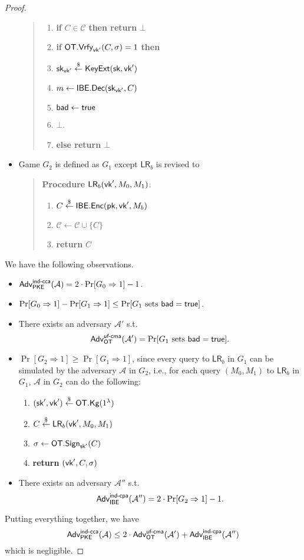 \documentclass[12pt]{article}
\newcommand{\getsr}{\stackrel{\$}{\gets}}
\newcommand{\Adv}{\textsf{Adv}}
\newcommand{\tab}{\hspace{0.3in}}
\newcommand{\Vrfy}{\textsf{Vrfy}}
\newcommand{\true}{\textsf{true}}
\newcommand{\C}{\mathcal{C}}
\theoremstyle{definition}
\newcommand{\PKE}{\textsf{PKE}}
\newcommand{\Kg}{\textsf{Kg}}
\newcommand{\Enc}{\textsf{Enc}}
\newcommand{\Dec}{\textsf{Dec}}
\newcommand{\pk}{\textsf{pk}}
\newcommand{\sk}{\textsf{sk}}
\newcommand{\A}{\mathcal{A}}
\newcommand{\LR}{\textsf{LR}}
\begin{document}
\begin{proof}
\begin{itemize}
\begin{quote}
\begin{enumerate}
\item {\bf if} $C \in \C$ {\bf then return} $\bot$
\item {\bf if} $\OT.\Vrfy_{\vk'}(C,\sigma)=1$ {\bf then}
\item \tab $\sk_{\vk'} \getsr \KeyExt(\sk, \vk')$
\item \tab $m \gets \IBE.\Dec(\sk_{\vk'}, C)$
\item \tab $\bad \gets \true$
\item \tab {\bf return} $\bot$.
\item {\bf else return} $\bot$
\end{enumerate}
\end{quote}
\item Game $G_2$ is defined as $G_1$ except $\LR_b$ is revised to
\begin{quote}
{\bf Procedure} $\LR_b(\vk',M_0,M_1)$:
\begin{enumerate}
\item $C \getsr \IBE.\Enc(\pk,\vk',M_b)$
\item $\C \gets \C \cup \{C\}$
\item {\bf return} $C$
\end{enumerate}
\end{quote}
\end{itemize}
We have the following observations.
\begin{itemize}
\item $\Adv_{\PKE}^{\cca}(\A) = 2\cdot\Pr[G_0 \Rightarrow 1]-1$.
\item $\Pr[G_0 \Rightarrow 1] - \Pr[G_1 \Rightarrow 1] \leq \Pr[\textrm{$G_1$ sets $\bad = \true$}]$.
\item There exists an adversary $\A'$ s.t. 
	$$\Adv_{\OT}^{\textsf{uf-cma}}(\A') = \Pr[\textrm{$G_1$ sets $\bad = \true$}].$$
\item $\Pr[G_2 \Rightarrow 1] \geq \Pr[G_1 \Rightarrow 1]$, since every query to $\LR_b$ in $G_1$ can be simulated by the adversary $\A$ in $G_2$, i.e., for each query $(M_0,M_1)$ to $\LR_b$ in $G_1$, $\A$ in $G_2$ can do the following:
	\begin{enumerate}
	\item $(\sk',\vk') \getsr \OT.\Kg(1^\lambda)$
	\item $C \getsr \LR_b(\vk', M_0, M_1)$
	\item $\sigma \gets \OT.\Sign_{\sk'}(C)$
	\item {\bf return} $(\textsf{vk}', C, \sigma)$
	\end{enumerate}
\item There exists an adversary $\A''$ s.t.
$$\Adv_{\IBE}^{\cpa}(\A'') = 2\cdot\Pr[G_2 \Rightarrow 1] - 1.$$
\end{itemize}
Putting everything together, we have
$$\Adv_{\PKE}^{\cca}(\A) \leq 2\cdot\Adv_{\OT}^{\textsf{uf-cma}}(\A') + \Adv_{\IBE}^{\cpa}(\A'')$$
which is negligible.
\end{proof}
\end{document}

